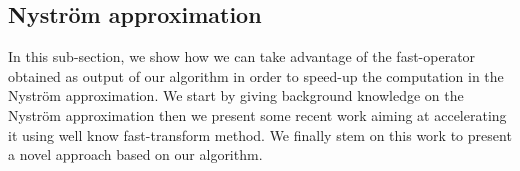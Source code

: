 
% 

\subsection{Nyström approximation}

In this sub-section, we show how we can take advantage of the fast-operator obtained as output of our \qkmeans algorithm in order to speed-up the computation in the Nyström approximation. 
We start by giving background knowledge on the Nyström approximation then we present some recent work aiming at accelerating it using well know fast-transform method. 
We finally stem on this work to present a novel approach based on our \qkmeans algorithm.

